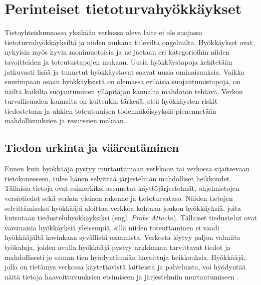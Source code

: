 
\chapter{Perinteiset tietoturvahyökkäykset}

Tietoyhteiskunnassa yksikään verkossa oleva laite ei ole suojassa
tietoturvahyökkäyksiltä ja niiden mukana tulevilta
ongelmilta. Hyökkäykset ovat nykyisin myös hyvin monimuotoisia ja ne
jaetaan eri kategorioihin niiden tavoitteiden ja toteutustapojen
mukaan. Uusia hyökkäystapoja kehitetään jatkuvasti lisää ja
tunnetut hyökkäystavat saavat uusia ominaisuuksia. Vaikka
suurimpaan osaan hyökkäyksistä on olemassa erilaisia
suojautumistapoja, on näiltä kaikilta suojautuminen ylläpitäjän
kannalta mahdoton tehtävä. Verkon turvallisuuden kannalta on kuitenkin
tärkeää, että hyökkäysten riskit tiedostetaan ja uhkien toteutumisen
todennäköisyyksiä pienennetään mahdollisuuksien ja resurssien
mukaan.


\section{Tiedon urkinta ja väärentäminen}

Ennen kuin hyökkääjä pystyy murtautumaan verkkoon tai verkossa
sijaitsevaan tietokoneeseen, tulee hänen selvittää järjestelmän
mahdolliset heikkoudet. Tällaisia tietoja ovat esimerkiksi asennetut
käyttöjärjestelmät, ohjelmistojen versiotiedot sekä verkon yleinen
rakenne ja tietoturvataso. Näiden tietojen selvittämiseksi hyökkääjä
aloittaa verkkoa kohtaan joukon hyökkäyksiä, joita kutsutaan
tiedusteluhyökkäyksiksi (engl. \textit{Probe Attacks}). Tällaiset
tiedustelut ovat varsinaisia hyökkäyksiä yleisempiä, sillä niiden
toteuttaminen ei vaadi hyökkääjältä kovinkaan syvällistä
osaamista. Verkosta löytyy paljon valmiita työkaluja, joiden avulla
hyökkääjä pystyy urkkimaan tarvittavat tiedot ja mahdollisesti jo
saman tien hyödyntämään havaittuja heikkouksia. Hyökkääjä, jolla on
tietämys verkossa käytettävistä laitteista ja palveluista, voi
hyödyntää näitä tietoja haavoittuvuuksien etsimiseen ja järjestelmiin
murtautumiseen \cite{IDS}.

